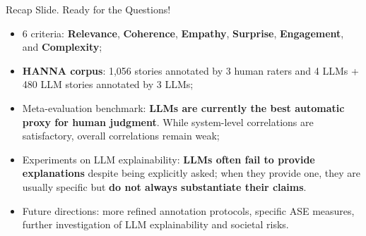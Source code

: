 \begin{frame}{Recap Slide. Ready for the Questions!}
    \begin{itemize}
        \item 6 criteria: \textbf{Relevance}, \textbf{Coherence}, \textbf{Empathy}, \textbf{Surprise}, \textbf{Engagement}, and \textbf{Complexity};
        \item \textbf{HANNA corpus}: 1,056 stories annotated by 3 human raters and 4 LLMs + 480 LLM stories annotated by 3 LLMs;
        \item Meta-evaluation benchmark: \textbf{LLMs are currently the best automatic proxy for human judgment}. While system-level correlations are satisfactory, overall correlations remain weak;
        \item Experiments on LLM explainability: \textbf{LLMs often fail to provide explanations} despite being explicitly asked; when they provide one, they are usually specific but \textbf{do not always substantiate their claims}.
        \item Future directions: more refined annotation protocols, specific ASE measures, further investigation of LLM explainability and societal risks.
    \end{itemize}
\end{frame}
